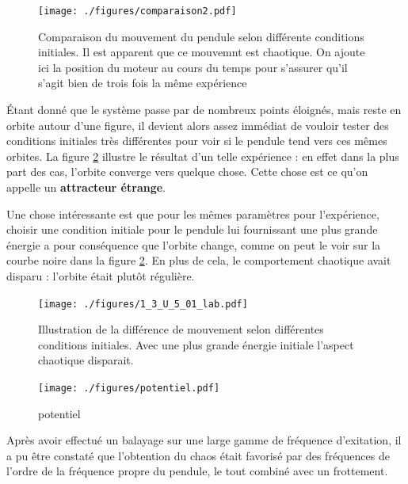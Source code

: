 \documentclass[a4paper,12pt,oneside]{article}
\begin{document}
\begin{figure}[h!]
  \begin{center}
  \texttt{[image: ./figures/comparaison2.pdf]}
  \caption{Comparaison du mouvement du pendule selon différente conditions initiales. Il est apparent que ce mouvemnt est chaotique. On ajoute ici la position du moteur au cours du temps pour s'assurer qu'il s'agit bien de trois fois la même expérience} \label{fig:comparaison2}
  \end{center}
\end{figure}

Étant donné que le système passe par de nombreux points éloignés, mais reste en orbite autour d'une figure, il devient alors assez immédiat de vouloir tester des conditions initiales très différentes pour voir si le pendule tend vers ces mêmes orbites. La figure \ref{fig:1_3_U_5_01_lab} illustre le résultat d'un telle expérience : en effet dans la plus part des cas, l'orbite converge vers quelque chose. Cette chose est ce qu'on appelle un \textbf{attracteur étrange}.

Une chose intéressante est que pour les mêmes paramètres pour l'expérience, choisir une condition initiale pour le pendule lui fournissant une plus grande énergie a pour conséquence que l'orbite change, comme on peut le voir sur la courbe noire dans la figure \ref{fig:1_3_U_5_01_lab}. En plus de cela, le comportement chaotique avait disparu : l'orbite était plutôt régulière.

\begin{figure}[h!]
  \begin{center}
  \texttt{[image: ./figures/1\_3\_U\_5\_01\_lab.pdf]}
  \caption{Illustration de la différence de mouvement selon différentes conditions initiales. Avec une plus grande énergie initiale l'aspect chaotique disparait.} \label{fig:1_3_U_5_01_lab}
  \end{center}
\end{figure}

\begin{figure}[h!]
  \begin{center}
  \texttt{[image: ./figures/potentiel.pdf]}
  \caption{potentiel} \label{fig:potentiel}
  \end{center}
\end{figure}



Après avoir effectué un balayage sur une large gamme de fréquence d'exitation, il a pu être constaté que l'obtention du chaos était favorisé par des fréquences de l'ordre de la fréquence propre du pendule, le tout combiné avec un frottement.
\end{document}
